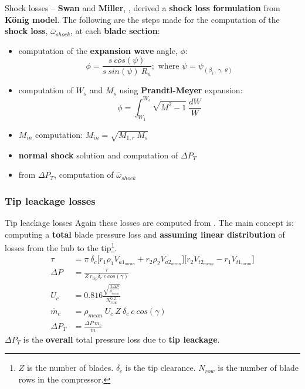 	\begin{frame}{Shock losses -- }
		\textbf{Swan} and \textbf{Miller}, \cite[Sec. 6.7]{axial2004}, derived a \textbf{shock loss formulation} from \textbf{K\"onig model}. 
		\newline 
		\newline
		The following are the steps made for the computation of the \textbf{shock loss}, $\bar{\omega}_{shock}$, at each \textbf{blade section}:
		\begin{itemize}
			\item computation of the \textbf{expansion wave} angle, $\phi$: 
				\begin{equation}
					\phi = \frac{s \ cos(\psi)}{s \ sin(\psi) \ R_u}; \text{ where } \psi = \psi_{(\beta_1, \ \gamma, \ \theta)} \nonumber
				\end{equation}
			\item computation of $W_s$ and $M_s$ using \textbf{Prandtl-Meyer} expansion: 
			\begin{equation}
				\phi = \int_{W_1}^{W_s} \sqrt{M^2 - 1} \ \frac{dW}{W} \nonumber
			\end{equation}
			\item $M_{in}$ computation: $M_{in} = \sqrt{M_{1,r} \ M_s}$
			\item \textbf{normal shock} solution and computation of $\Delta P_T$
			\item from $\Delta P_T$, computation of $\bar{\omega}_{shock}$
		\end{itemize}
	\end{frame}

\subsubsection{Tip leackage losses}
	{\nologo
	\begin{frame}{Tip leackage losses}
		Again these losses are computed from \cite[Sec. 6.9]{axial2004}. The main concept is: computing a \textbf{total} blade pressure loss and \textbf{assuming linear distribution} of losses from the hub to the tip\footnote{$Z$ is the number of blades. $\delta_c$ is the tip clearance. $N_{row}$ is the number of blade rows in the compressor.}. 
		\begin{align}
			\tau & = \pi \ \delta_c \Big[ r_1 \rho_1 V_{a1_{mean}} + r_2 \rho_2 V_{a2_{mean}} \Big] \Big[ r_2 V_{t2_{mean}} - r_1 V_{t1_{mean}} \Big] \nonumber \\ 
			\Delta P & = \frac{\tau}{Z \ r_{tip} \delta_c \ c \ cos(\gamma)} \nonumber \\ 
			U_c & = 0.816 \frac{\sqrt{\frac{2 \Delta P}{\rho_{mean}}}}{N_{row}^{0.2}} \nonumber \\ 
			\dot{m_c} & = \rho_{mean} \ U_c \ Z \ \delta_c \ c \ cos(\gamma) \nonumber \\ 
			\Delta P_T & = \frac{\Delta P \ \dot{m_c}}{\dot{m}} \nonumber  
		\end{align}
		$\Delta P_T$ is the \textbf{overall} total pressure loss due to \textbf{tip leackage}.
		\vspace{0.11cm}
	\end{frame}
	}

